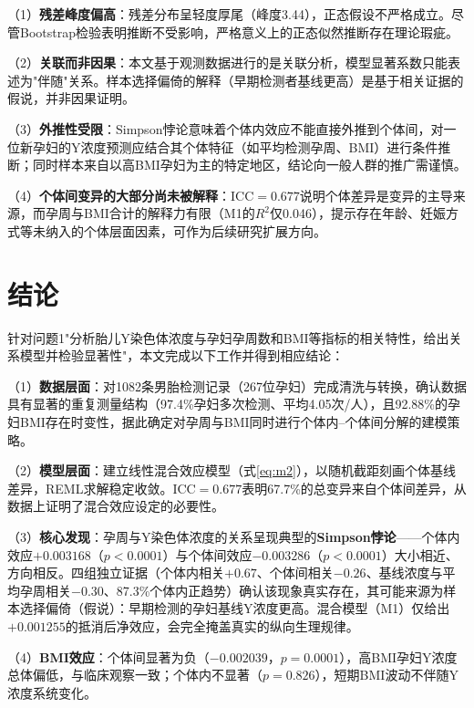 \documentclass[12pt,a4paper]{ctexart}
\begin{document}
（1）\textbf{残差峰度偏高}：残差分布呈轻度厚尾（峰度3.44），正态假设不严格成立。尽管Bootstrap检验表明推断不受影响，严格意义上的正态似然推断存在理论瑕疵。

（2）\textbf{关联而非因果}：本文基于观测数据进行的是关联分析，模型显著系数只能表述为"伴随"关系。样本选择偏倚的解释（早期检测者基线更高）是基于相关证据的假说，并非因果证明。

（3）\textbf{外推性受限}：Simpson悖论意味着个体内效应不能直接外推到个体间，对一位新孕妇的Y浓度预测应结合其个体特征（如平均检测孕周、BMI）进行条件推断；同时样本来自以高BMI孕妇为主的特定地区，结论向一般人群的推广需谨慎。

（4）\textbf{个体间变异的大部分尚未被解释}：ICC$=0.677$说明个体差异是变异的主导来源，而孕周与BMI合计的解释力有限（M1的$R^2$仅0.046），提示存在年龄、妊娠方式等未纳入的个体层面因素，可作为后续研究扩展方向。

\section{结论}

针对问题1"分析胎儿Y染色体浓度与孕妇孕周数和BMI等指标的相关特性，给出关系模型并检验显著性"，本文完成以下工作并得到相应结论：

（1）\textbf{数据层面}：对1082条男胎检测记录（267位孕妇）完成清洗与转换，确认数据具有显著的重复测量结构（97.4\%孕妇多次检测、平均4.05次/人），且92.88\%的孕妇BMI存在时变性，据此确定对孕周与BMI同时进行个体内--个体间分解的建模策略。

（2）\textbf{模型层面}：建立线性混合效应模型（式\ref{eq:m2}），以随机截距刻画个体基线差异，REML求解稳定收敛。ICC$=0.677$表明67.7\%的总变异来自个体间差异，从数据上证明了混合效应设定的必要性。

（3）\textbf{核心发现}：孕周与Y染色体浓度的关系呈现典型的\textbf{Simpson悖论}——个体内效应$+0.003168$（$p<0.0001$）与个体间效应$-0.003286$（$p<0.0001$）大小相近、方向相反。四组独立证据（个体内相关$+0.67$、个体间相关$-0.26$、基线浓度与平均孕周相关$-0.30$、87.3\%个体内正趋势）确认该现象真实存在，其可能来源为样本选择偏倚（假说）：早期检测的孕妇基线Y浓度更高。混合模型（M1）仅给出$+0.001255$的抵消后净效应，会完全掩盖真实的纵向生理规律。

（4）\textbf{BMI效应}：个体间显著为负（$-0.002039$，$p=0.0001$），高BMI孕妇Y浓度总体偏低，与临床观察一致；个体内不显著（$p=0.826$），短期BMI波动不伴随Y浓度系统变化。
\end{document}

